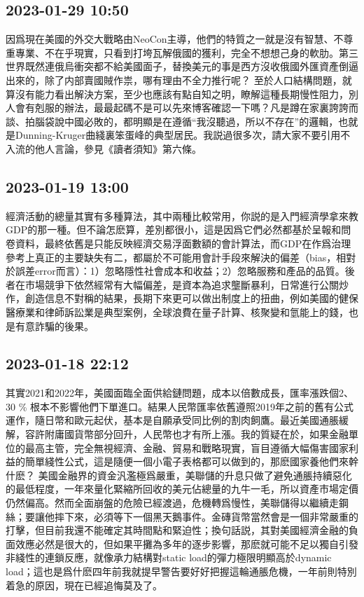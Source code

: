 \documentclass[twocolumn]{ctexart}
\begin{document}
\subsection*{2023-01-29 10:50}

因爲現在美國的外交大戰略由NeoCon主導，他們的特質之一就是沒有智慧、不尊重專業、不在乎現實，只看到打垮瓦解俄國的獲利，完全不想想己身的軟肋。第三世界既然連俄烏衝突都不給美國面子，替換美元的事是西方沒收俄國外匯資產倒逼出來的，除了内部賣國賊作祟，哪有理由不全力推行呢？
至於人口結構問題，就算沒有能力看出解決方案，至少也應該有點自知之明，瞭解這種長期慢性阻力，別人會有剋服的辦法，最最起碼不是可以先來博客確認一下嗎？凡是蹲在家裏誇誇而談、拍腦袋說中國必敗的，都明顯是在遵循“我沒聽過，所以不存在”的邏輯，也就是Dunning-Kruger曲綫裏笨蛋峰的典型居民。我説過很多次，請大家不要引用不入流的他人言論，參見《讀者須知》第六條。
\subsection*{2023-01-19 13:00}

經濟活動的總量其實有多種算法，其中兩種比較常用，你説的是入門經濟學拿來教GDP的那一種。但不論怎麽算，差別都很小，這是因爲它們必然都基於呈報和問卷資料，最終依舊是只能反映經濟交易浮面數額的會計算法，而GDP在作爲治理參考上真正的主要缺失有二，都屬於不可能用會計手段來解決的偏差（bias，相對於誤差error而言）：1）忽略隱性社會成本和收益；2）忽略服務和產品的品質。後者在市場競爭下依然經常有大幅偏差，是資本為追求壟斷暴利，日常進行公關炒作，創造信息不對稱的結果，長期下來更可以做出制度上的扭曲，例如美國的健保醫療業和律師訴訟業是典型案例，全球浪費在量子計算、核聚變和氫能上的錢，也是有意詐騙的後果。
\subsection*{2023-01-18 22:12}

其實2021和2022年，美國面臨全面供給鏈問題，成本以倍數成長，匯率漲跌個2、30 \% 根本不影響他們下單進口。結果人民幣匯率依舊遵照2019年之前的舊有公式運作，隨日幣和歐元起伏，基本是自願承受同比例的割肉飼鷹。最近美國通脹緩解，容許附庸國貨幣部分回升，人民幣也才有所上漲。我的質疑在於，如果金融單位的最高主管，完全無視經濟、金融、貿易和戰略現實，盲目遵循大幅傷害國家利益的簡單綫性公式，這是隨便一個小電子表格都可以做到的，那麽國家養他們來幹什麽？
美國金融界的資金汎濫極爲嚴重，美聯儲的升息只做了避免通脹持續惡化的最低程度，一年來量化緊縮所回收的美元佔總量的九牛一毛，所以資產市場定價仍然偏高。然而全面崩盤的危險已經渡過，危機轉爲慢性，美聯儲得以繼續走鋼絲；要讓他摔下來，必須等下一個黑天鵝事件。金磚貨幣當然會是一個非常嚴重的打擊，但目前我還不能確定其時間點和緊迫性；換句話説，其對美國經濟金融的負面效應必然是很大的，但如果平攤為多年的逐步影響，那麽就可能不足以獨自引發非綫性的連鎖反應，就像承力結構對static load的彈力極限明顯高於dynamic load；這也是爲什麽四年前我就提早警告要好好把握這輪通脹危機，一年前則特別着急的原因，現在已經追悔莫及了。
\end{document}

